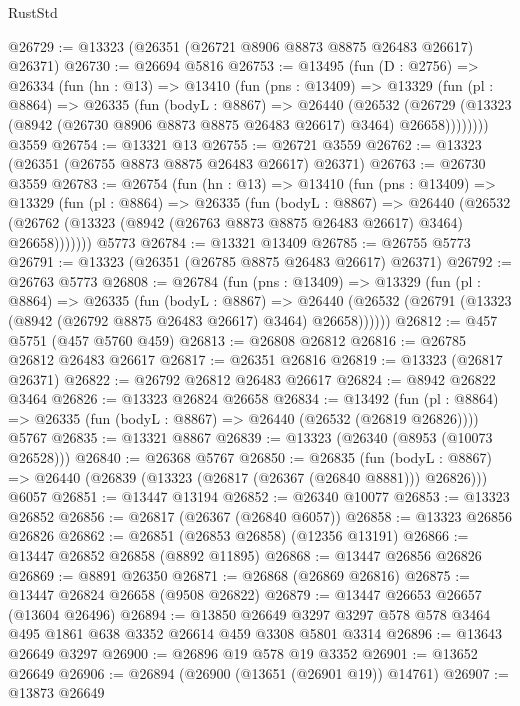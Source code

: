 \begin{lexlean}{RustStd}
\begin{coremodule}
@26729 := @13323 (@26351 (@26721 @8906 @8873 @8875 @26483 @26617) @26371)
@26730 := @26694 @5816
@26753 := @13495
    (fun (D : @2756) =>
    @26334
      (fun (hn : @13) =>
      @13410
        (fun (pns : @13409) =>
        @13329
          (fun (pl : @8864) =>
          @26335
            (fun (bodyL : @8867) =>
            @26440
              (@26532
                (@26729
                  (@13323 (@8942 (@26730 @8906 @8873 @8875 @26483 @26617) @3464) @26658))))))))
    @3559
@26754 := @13321 @13
@26755 := @26721 @3559
@26762 := @13323 (@26351 (@26755 @8873 @8875 @26483 @26617) @26371)
@26763 := @26730 @3559
@26783 := @26754
    (fun (hn : @13) =>
    @13410
      (fun (pns : @13409) =>
      @13329
        (fun (pl : @8864) =>
        @26335
          (fun (bodyL : @8867) =>
          @26440
            (@26532 (@26762 (@13323 (@8942 (@26763 @8873 @8875 @26483 @26617) @3464) @26658)))))))
    @5773
@26784 := @13321 @13409
@26785 := @26755 @5773
@26791 := @13323 (@26351 (@26785 @8875 @26483 @26617) @26371)
@26792 := @26763 @5773
@26808 := @26784
    (fun (pns : @13409) =>
    @13329
      (fun (pl : @8864) =>
      @26335
        (fun (bodyL : @8867) =>
        @26440 (@26532 (@26791 (@13323 (@8942 (@26792 @8875 @26483 @26617) @3464) @26658))))))
@26812 := @457 @5751 (@457 @5760 @459)
@26813 := @26808 @26812
@26816 := @26785 @26812 @26483 @26617
@26817 := @26351 @26816
@26819 := @13323 (@26817 @26371)
@26822 := @26792 @26812 @26483 @26617
@26824 := @8942 @26822 @3464
@26826 := @13323 @26824 @26658
@26834 := @13492
    (fun (pl : @8864) => @26335 (fun (bodyL : @8867) => @26440 (@26532 (@26819 @26826))))
    @5767
@26835 := @13321 @8867
@26839 := @13323 (@26340 (@8953 (@10073 @26528)))
@26840 := @26368 @5767
@26850 := @26835
    (fun (bodyL : @8867) => @26440 (@26839 (@13323 (@26817 (@26367 (@26840 @8881))) @26826)))
    @6057
@26851 := @13447 @13194
@26852 := @26340 @10077
@26853 := @13323 @26852
@26856 := @26817 (@26367 (@26840 @6057))
@26858 := @13323 @26856 @26826
@26862 := @26851 (@26853 @26858) (@12356 @13191)
@26866 := @13447 @26852 @26858 (@8892 @11895)
@26868 := @13447 @26856 @26826
@26869 := @8891 @26350
@26871 := @26868 (@26869 @26816)
@26875 := @13447 @26824 @26658 (@9508 @26822)
@26879 := @13447 @26653 @26657 (@13604 @26496)
@26894 := @13850
    @26649
    @3297
    @3297
    @578
    @578
    @3464
    @495
    @1861
    @638
    @3352
    @26614
    @459
    @3308
    @5801
    @3314
@26896 := @13643 @26649 @3297
@26900 := @26896 @19 @578 @19 @3352
@26901 := @13652 @26649
@26906 := @26894 (@26900 (@13651 (@26901 @19)) @14761)
@26907 := @13873 @26649

\end{coremodule}
\end{lexlean}
